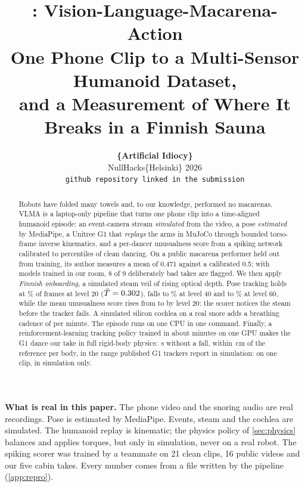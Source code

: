 \documentclass[10pt]{article}
\title{\vlma: Vision-Language-Macarena-Action\\[4pt]
\large\mdseries One Phone Clip to a Multi-Sensor Humanoid Dataset,\\ and a Measurement of Where It Breaks in a Finnish Sauna}
\author{
  \textbf{\{Artificial Idiocy\}}\\
  NullHacks\{Helsinki\} 2026\\
  \texttt{github repository linked in the submission}
}
\date{}
\newcommand{\vlma}{\textsc{VLMA}}
\begin{document}
\maketitle

\begin{abstract}
Robots have folded many towels and, to our knowledge, performed no macarenas. \vlma{} is a laptop-only pipeline that turns one phone clip into a time-aligned humanoid episode: an event-camera stream \emph{simulated} from the video, a pose \emph{estimated} by MediaPipe, a Unitree G1 that \emph{replays} the arms in MuJoCo through bounded torso-frame inverse kinematics, and a per-dancer unusualness score from a spiking network calibrated to percentiles of clean dancing. On a public macarena performer held out from training, its author measures a mean of 0.471 against a calibrated 0.5; with models trained in our room, 8 of 9 deliberately bad takes are flagged. We then apply \emph{Finnish onboarding}, a simulated steam veil of rising optical depth. Pose tracking holds at \DetSTwenty\% of frames at level 20 ($\bar T=0.302$), falls to \DetSForty\% at level 40 and to \DetSSixty\% at level 60, while the mean unusualness score rises from \UnuSZero{} to \UnuSTwenty{} by level 20: the scorer notices the steam before the tracker fails. A simulated silicon cochlea on a real snore adds a breathing cadence of \SnoreBpm{} per minute. The episode runs on one CPU in one command. Finally, a reinforcement-learning tracking policy trained in about \PhysTrainMin{} minutes on one GPU makes the G1 dance our take in full rigid-body physics: \PhysSeconds\,s without a fall, within \PhysBodyErrCm\,cm of the reference per body, in the range published G1 trackers report in simulation: \sotaish{} on one clip, in simulation only.
\end{abstract}


\vspace{6pt}
\begin{takeaway}
\textbf{What is real in this paper.} The phone video and the snoring audio are real recordings. Pose is estimated by MediaPipe. Events, steam and the cochlea are simulated. The humanoid replay is kinematic; the physics policy of \cref{sec:physics} balances and applies torques, but only in simulation, never on a real robot. The spiking scorer was trained by a teammate on 21 clean clips, 16 public videos and our five cabin takes. Every number comes from a file written by the pipeline (\cref{app:repro}).
\end{takeaway}
\end{document}
